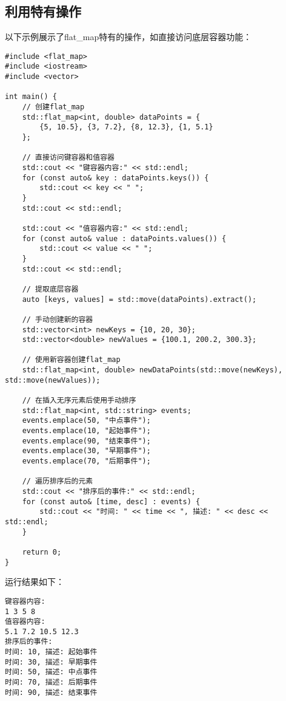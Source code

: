 \documentclass[a4paper, 12pt]{article}
\begin{document}
\subsection{利用特有操作}

以下示例展示了flat\_map特有的操作，如直接访问底层容器功能：

\begin{lstlisting}[style=cpp]
#include <flat_map>
#include <iostream>
#include <vector>

int main() {
    // 创建flat_map
    std::flat_map<int, double> dataPoints = {
        {5, 10.5}, {3, 7.2}, {8, 12.3}, {1, 5.1}
    };
    
    // 直接访问键容器和值容器
    std::cout << "键容器内容:" << std::endl;
    for (const auto& key : dataPoints.keys()) {
        std::cout << key << " ";
    }
    std::cout << std::endl;
    
    std::cout << "值容器内容:" << std::endl;
    for (const auto& value : dataPoints.values()) {
        std::cout << value << " ";
    }
    std::cout << std::endl;
    
    // 提取底层容器
    auto [keys, values] = std::move(dataPoints).extract();
    
    // 手动创建新的容器
    std::vector<int> newKeys = {10, 20, 30};
    std::vector<double> newValues = {100.1, 200.2, 300.3};
    
    // 使用新容器创建flat_map
    std::flat_map<int, double> newDataPoints(std::move(newKeys), std::move(newValues));
    
    // 在插入无序元素后使用手动排序
    std::flat_map<int, std::string> events;
    events.emplace(50, "中点事件");
    events.emplace(10, "起始事件");
    events.emplace(90, "结束事件");
    events.emplace(30, "早期事件");
    events.emplace(70, "后期事件");
    
    // 遍历排序后的元素
    std::cout << "排序后的事件:" << std::endl;
    for (const auto& [time, desc] : events) {
        std::cout << "时间: " << time << ", 描述: " << desc << std::endl;
    }
    
    return 0;
}
\end{lstlisting}

运行结果如下：

\begin{lstlisting}[style=cpp]
键容器内容:
1 3 5 8
值容器内容:
5.1 7.2 10.5 12.3
排序后的事件:
时间: 10, 描述: 起始事件
时间: 30, 描述: 早期事件
时间: 50, 描述: 中点事件
时间: 70, 描述: 后期事件
时间: 90, 描述: 结束事件
\end{lstlisting}
\end{document}
